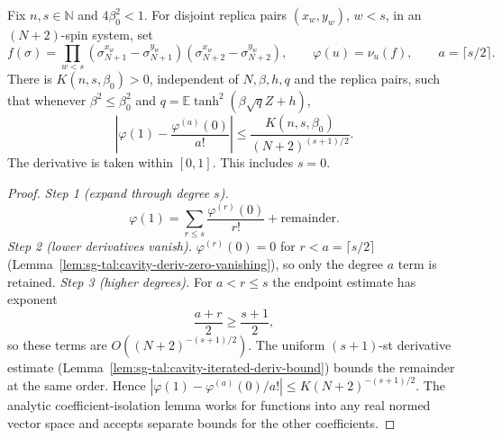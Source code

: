 \begin{lemma}\label{lem:sg-tal:hanen-leading-taylor}
\leanok
{}
Fix $n,s\in\mathbb N$ and $4\beta_0^2<1$. For disjoint replica pairs $(x_w,y_w)$,
$w<s$, in an $(N+2)$-spin system, set
\[
 f(\sigma)=\prod_{w<s}(\sigma^{x_w}_{N+1}-\sigma^{y_w}_{N+1})
                  (\sigma^{x_w}_{N+2}-\sigma^{y_w}_{N+2}),\qquad
 \varphi(u)=\nu_u(f),\qquad a=\lceil s/2\rceil.
\]
There is $K(n,s,\beta_0)>0$, independent of $N,\beta,h,q$ and the replica pairs,
such that whenever $\beta^2\le\beta_0^2$ and
$q=\mathbb E\tanh^2(\beta\sqrt q Z+h)$,
\[
 \left|\varphi(1)-\frac{\varphi^{(a)}(0)}{a!}\right|
 \le \frac{K(n,s,\beta_0)}{(N+2)^{(s+1)/2}}.
\]
The derivative is taken within $[0,1]$. This includes $s=0$.
\end{lemma}
\begin{proof}
\leanok
\emph{Step 1 (expand through degree $s$).}
\[
\varphi(1)=\sum_{r\le s}\frac{\varphi^{(r)}(0)}{r!}+\text{remainder}.
\]
\emph{Step 2 (lower derivatives vanish).} $\varphi^{(r)}(0)=0$ for $r<a=\lceil s/2\rceil$ (Lemma~\ref{lem:sg-tal:cavity-deriv-zero-vanishing}), so only the degree $a$ term is retained.
\emph{Step 3 (higher degrees).} For $a<r\le s$ the endpoint estimate has exponent
\[
\frac{a+r}2\ge\frac{s+1}2,
\]
so these terms are $O((N+2)^{-(s+1)/2})$. The uniform $(s+1)$-st derivative estimate (Lemma~\ref{lem:sg-tal:cavity-iterated-deriv-bound}) bounds the remainder at the same order. Hence $|\varphi(1)-\varphi^{(a)}(0)/a!|\le K(N+2)^{-(s+1)/2}$. The analytic coefficient-isolation lemma works for functions into any real normed vector space and accepts separate bounds for the other coefficients.
\end{proof}

